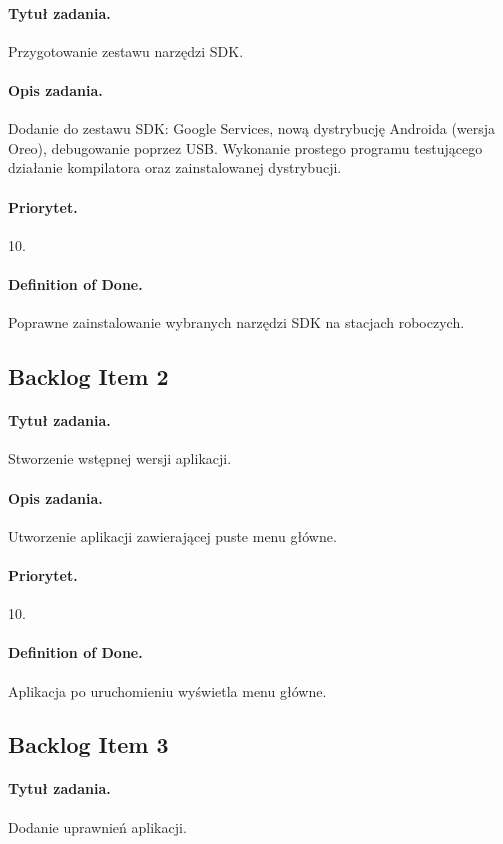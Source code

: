 \documentclass[a4paper]{article}
\begin{document}
\paragraph{Tytuł zadania.} Przygotowanie zestawu narzędzi SDK.
\paragraph{Opis zadania.} Dodanie do zestawu SDK: Google Services, nową dystrybucję Androida (wersja Oreo), debugowanie poprzez USB. Wykonanie prostego programu testującego działanie kompilatora oraz zainstalowanej dystrybucji.
\paragraph{Priorytet.} 10.
\paragraph{Definition of Done.} Poprawne zainstalowanie wybranych narzędzi SDK na stacjach roboczych.

\subsection{Backlog Item 2}
\paragraph{Tytuł zadania.} Stworzenie wstępnej wersji aplikacji.
\paragraph{Opis zadania.} Utworzenie aplikacji zawierającej puste menu główne.
\paragraph{Priorytet.} 10.
\paragraph{Definition of Done.} Aplikacja po uruchomieniu wyświetla menu główne.

\subsection{Backlog Item 3}
\paragraph{Tytuł zadania.} Dodanie uprawnień aplikacji.
\end{document}
